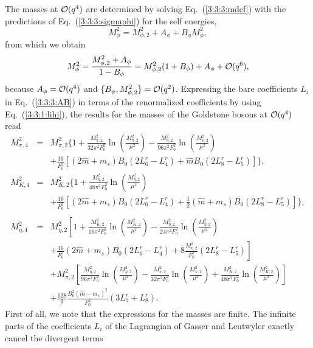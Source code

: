 \documentclass[twoside,12pt]{article}
\begin{document}
   The masses at ${\cal O}(q^4)$ are determined by solving Eq.~(\ref{3:3:3:mdef})
with the predictions of Eq.\ (\ref{3:3:3:sigmaphi}) for the self energies,
$$
M^2_\phi=M_{\phi,2}^2+A_\phi+B_\phi M^2_\phi,
$$
from which we obtain
\begin{displaymath}
M^2_\phi=\frac{M_{\phi,2}^2+A_\phi}{1-B_\phi}=M_{\phi,2}^2(1+B_\phi)+A_\phi+
{\cal O}(q^6),
\end{displaymath}
   because $A_\phi={\cal O}(q^4)$ and $\{B_\phi, M_{\phi,2}^2\}={\cal O}(q^2)$.
   Expressing the bare coefficients $L_i$ in Eq.\ (\ref{3:3:3:AB}) in terms of
the renormalized coefficients by using Eq.\ (\ref{3:3:1:lihi}),
the results for the masses of the Goldstone bosons at ${\cal O}(q^4)$
read \cite{Gasser:1984gg}
\begin{eqnarray}
\label{3:3:3:mpi24}
M^2_{\pi,4}&=&M^2_{\pi,2}\Bigg\{1+\frac{M^2_{\pi,2}}{32\pi^2F^2_0}
\ln\left(\frac{M^2_{\pi,2}}{\mu^2}\right)-\frac{M^2_{\eta,2}}{96\pi^2F^2_0}
\ln\left(\frac{M^2_{\eta,2}}{\mu^2}\right)\nonumber\\
&&+\frac{16}{F^2_0}\left[(2\hat m+m_s)B_0(2L^r_6-L^r_4)
+\hat mB_0(2L^r_8-L^r_5)\right]\Bigg\},\\
\label{3:3:3:mk24}
M^2_{K,4}&=&M^2_{K,2}\Bigg\{1+\frac{M^2_{\eta,2}}{48\pi^2F^2_0}
\ln\left(\frac{M^2_{\eta,2}}{\mu^2}\right)\nonumber\\
&&+\frac{16}{F^2_0}\left[(2\hat m+m_s)B_0(2L^r_6-L^r_4)
+\frac{1}{2}(\hat m+m_s)B_0(2L^r_8-L^r_5)\right]\Bigg\},\nonumber\\
&&\\
\label{3:3:3:meta24}
M^2_{\eta,4}&=&M^2_{\eta,2}\left[1+\frac{M^2_{K,2}}{16\pi^2F^2_0}
\ln\left(\frac{M^2_{K,2}}{\mu^2}\right)
-\frac{M^2_{\eta,2}}{24\pi^2F^2_0}\ln\left(\frac{M^2_{\eta,2}}{\mu^2}\right)
\right.\nonumber\\
&&\left.+\frac{16}{F^2_0}(2\hat m+m_s)B_0(2L^r_6-L^r_4)
+8\frac{M^2_{\eta,2}}{F^2_0}(2L^r_8-L^r_5)\right]\nonumber\\
&&+M^2_{\pi,2}\left[\frac{M^2_{\eta,2}}{96\pi^2F^2_0}
\ln\left(\frac{M^2_{\eta,2}}{\mu^2}\right)
-\frac{M^2_{\pi,2}}{32\pi^2F^2_0}
\ln\left(\frac{M^2_{\pi,2}}{\mu^2}\right)
+\frac{M^2_{K,2}}{48\pi^2F^2_0}
\ln\left(\frac{M^2_{K,2}}{\mu^2}\right)\right]\nonumber\\
&&+\frac{128}{9}\frac{B^2_0(\hat m-m_s)^2}{F^2_0}
(3L^r_7+L^r_8).
\end{eqnarray}
   First of all, we note that the expressions for the masses are finite.
   The infinite parts of the coefficients $L_i$ of the Lagrangian
of Gasser and Leutwyler exactly cancel the divergent terms
\end{document}
